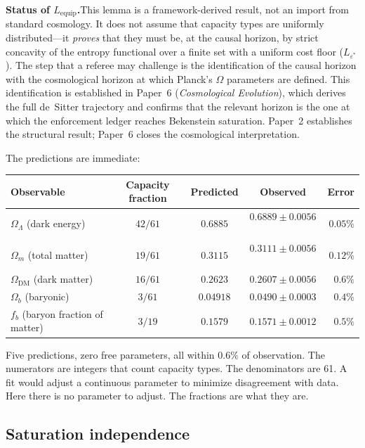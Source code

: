 \documentclass[11pt]{article}
\begin{document}
\smallskip
\noindent\textbf{Status of $L_{\mathrm{equip}}$.}\quad This lemma is a framework-derived result, not an import from standard cosmology.  It does not assume that capacity types are uniformly distributed---it \emph{proves} that they must be, at the causal horizon, by strict concavity of the entropy functional over a finite set with a uniform cost floor ($L_{\varepsilon^*}$).  The step that a referee may challenge is the identification of the causal horizon with the cosmological horizon at which Planck's $\Omega$ parameters are defined.  This identification is established in Paper~6 (\emph{Cosmological Evolution}), which derives the full de~Sitter trajectory and confirms that the relevant horizon is the one at which the enforcement ledger reaches Bekenstein saturation.  Paper~2 establishes the structural result; Paper~6 closes the cosmological interpretation.

The predictions are immediate:

\begin{center}
\small
\begin{tabular}{lcccr}
\toprule
\textbf{Observable} & \textbf{Capacity fraction} & \textbf{Predicted} & \textbf{Observed} & \textbf{Error} \\
\midrule
$\Omega_\Lambda$ (dark energy) & $42/61$ & $0.6885$ & $0.6889 \pm 0.0056$~\cite{Planck2020} & $0.05\%$ \\
$\Omega_m$ (total matter) & $19/61$ & $0.3115$ & $0.3111 \pm 0.0056$~\cite{Planck2020} & $0.12\%$ \\
$\Omega_{\mathrm{DM}}$ (dark matter) & $16/61$ & $0.2623$ & $0.2607 \pm 0.0056$ & $0.6\%$ \\
$\Omega_b$ (baryonic) & $3/61$ & $0.04918$ & $0.0490 \pm 0.0003$ & $0.4\%$ \\
$f_b$ (baryon fraction of matter) & $3/19$ & $0.1579$ & $0.1571 \pm 0.0012$ & $0.5\%$ \\
\bottomrule
\end{tabular}
\end{center}

Five predictions, zero free parameters, all within $0.6\%$ of observation.  The numerators are integers that count capacity types.  The denominators are 61.  A fit would adjust a continuous parameter to minimize disagreement with data.  Here there is no parameter to adjust.  The fractions are what they are.

\subsection{Saturation independence}
\end{document}
